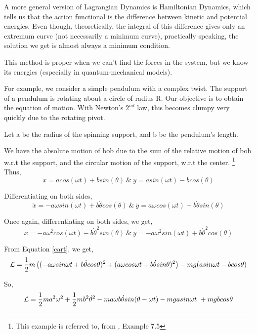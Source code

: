 \documentclass[a4paper]{article}
\begin{document}
A more general version of Lagrangian Dynamics is Hamiltonian Dynamics, which tells us that 
the action functional is the difference between kinetic and potential energies.
Even though, theoretically, the integral of this difference gives only an extremum curve (not necessarily a minimum curve), practically speaking, the solution we get is almost always a minimum condition.

This method is proper when we can't find the forces in the system, but we know its energies (especially in quantum-mechanical models).

For example, we consider a simple pendulum with a complex twist. The support of a pendulum is rotating about a circle of radius R. Our objective is to obtain the equation of motion. With Newton's $2^{nd}$ law, this becomes clumpy very quickly due to the rotating pivot.

Let a be the radius of the spinning support, and b be the pendulum's length.

We have the absolute motion of bob due to the sum of the relative motion of bob w.r.t the support, and the circular motion of the support, w.r.t the center. \footnote{This example is referred to, from \cite{thornton}, Example 7.5}
Thus, 
\begin{equation}
    x = acos(\omega t) + bsin(\theta) \ \& \ y = asin(\omega t) - bcos(\theta) \label{eq_1}
\end{equation}

Differentiating on both sides,
\begin{equation}
    \dot x = -a\omega sin(\omega t) + b\dot \theta cos(\theta)\ \& \  \dot y = a\omega cos(\omega t) + b\dot \theta sin(\theta) \label{eq_s_2}
\end{equation}

Once again, differentiating on both sides, we get,
\begin{equation}
    \ddot x = -a{\omega}^{2}cos(\omega t) - b{\dot \theta}^{2}sin(\theta)\ \& \ y = -a{\omega}^{2}sin(\omega t) + b{\dot \theta}^{2} cos(\theta) \label{eq_s_3}
\end{equation}

From Equation \ref{cart}, we get,
\begin{equation}
    \scriptsize{\mathcal{L} = {1\over2}m\left((-a\omega sin\omega t + b\dot \theta cos\theta)^2 + (a\omega cos\omega t + b\dot \theta sin\theta)^2\right) - mg(asin\omega t - bcos\theta)}
\end{equation}

So,
\begin{equation}
   \mathcal{L} =  {1\over2}ma^2\omega^2 +{1\over2}mb^2{\dot \theta}^2 - ma\omega b\dot\theta sin(\theta - \omega t) -mga sin\omega t\ + mgbcos\theta
\end{equation}
\end{document}
